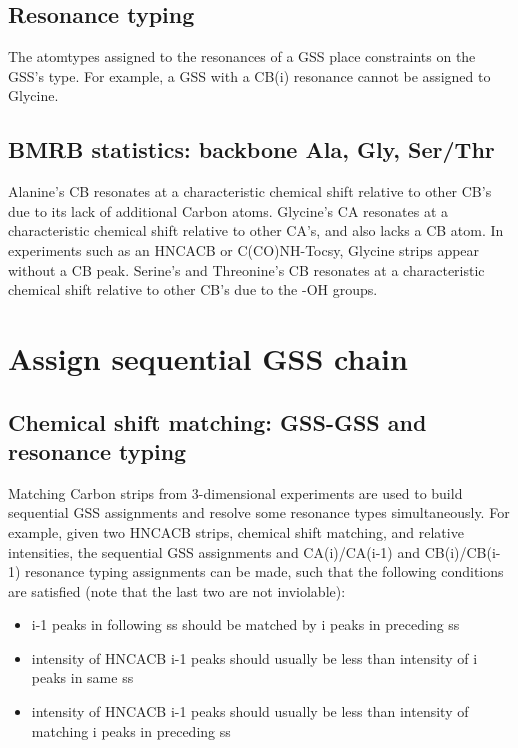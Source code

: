 \subsection*{Resonance typing}
The atomtypes assigned to the resonances of a GSS place constraints on the
GSS's type.  For example, a GSS with a CB(i) resonance cannot be assigned to 
Glycine.

\subsection*{BMRB statistics: backbone Ala, Gly, Ser/Thr}
Alanine's CB resonates at a characteristic chemical shift relative to other 
CB's due to its lack of additional Carbon atoms.
Glycine's CA resonates at a characteristic chemical shift relative to other
CA's, and also lacks a CB atom.  In experiments such as an HNCACB or 
C(CO)NH-Tocsy, Glycine strips appear without a CB peak.
Serine's and Threonine's CB resonates at a characteristic chemical shift 
relative to other CB's due to the -OH groups.



\section*{Assign sequential GSS chain}

\subsection*{Chemical shift matching: GSS-GSS and resonance typing}
\label{subsec_shift_matching_seq_gss}
Matching Carbon strips from 3-dimensional experiments are used to build 
sequential GSS assignments and resolve some resonance types simultaneously. 
For example, given two HNCACB strips, chemical shift matching, and relative 
intensities, the sequential GSS assignments and CA(i)/CA(i-1) and CB(i)/CB(i-1) 
resonance typing assignments can be made, such that the following conditions
are satisfied (note that the last two are not inviolable):
\begin{itemize}
  \item i-1 peaks in following ss should be matched by i peaks in preceding ss
  \item intensity of HNCACB i-1 peaks should usually be less than intensity of i peaks in same ss
  \item intensity of HNCACB i-1 peaks should usually be less than intensity of matching i peaks in preceding ss
\end{itemize}

